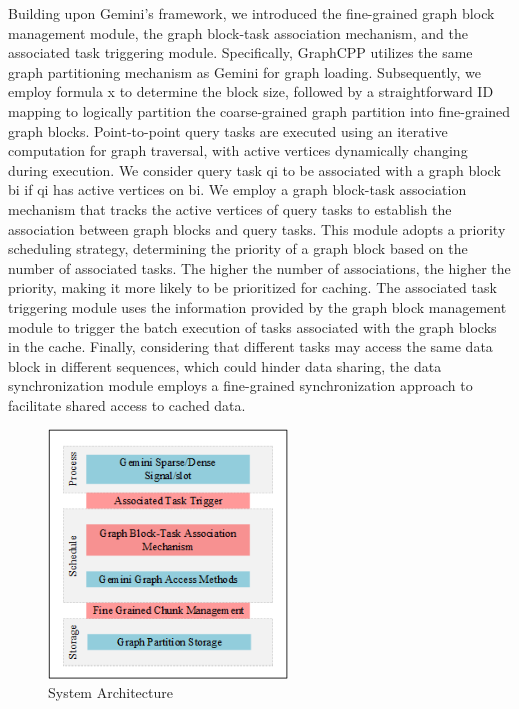 \documentclass[lettersize,journal]{IEEEtran} %
\begin{document}
Building upon Gemini’s framework, we introduced the fine-grained graph block management module, the graph block-task association mechanism, and the associated task triggering module. Specifically, GraphCPP utilizes the same graph partitioning mechanism as Gemini for graph loading. Subsequently, we employ formula x to determine the block size, followed by a straightforward ID mapping to logically partition the coarse-grained graph partition into fine-grained graph blocks. Point-to-point query tasks are executed using an iterative computation for graph traversal, with active vertices dynamically changing during execution. We consider query task qi to be associated with a graph block bi if qi has active vertices on bi. We employ a graph block-task association mechanism that tracks the active vertices of query tasks to establish the association between graph blocks and query tasks. This module adopts a priority scheduling strategy, determining the priority of a graph block based on the number of associated tasks. The higher the number of associations, the higher the priority, making it more likely to be prioritized for caching. The associated task triggering module uses the information provided by the graph block management module to trigger the batch execution of tasks associated with the graph blocks in the cache. Finally, considering that different tasks may access the same data block in different sequences, which could hinder data sharing, the data synchronization module employs a fine-grained synchronization approach to facilitate shared access to cached data.


\begin{figure}[!t]
\centering
\includegraphics[width=2.5in]{viso插图}
\caption{System Architecture}  
\label{viso插图}
\end{figure}
 
\end{document}
